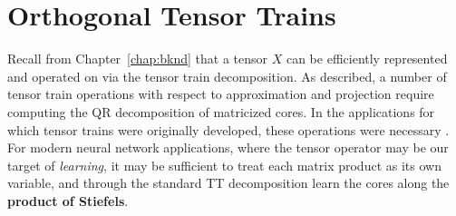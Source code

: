 \section{Orthogonal Tensor Trains}\label{sec:ott}
Recall from Chapter~\ref{chap:bknd} that a tensor $X$ can be efficiently represented and operated on via the tensor train decomposition.
As described, a number of tensor train operations with respect to approximation and projection require computing the QR decomposition of matricized cores. In the applications for which tensor trains were originally developed, these operations were necessary \citep{oseledets2011tensor,klus2018tensor}. For modern neural network applications, where the tensor operator may be our target of \textit{learning}, it may be sufficient to treat each matrix product as its own variable, and through the standard TT decomposition learn the cores along the \textbf{product of Stiefels}.


